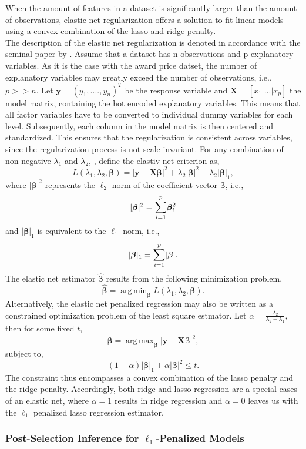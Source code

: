 \documentclass[a4paper,12pt, headsepline]{scrartcl}
\DeclareMathOperator*{\argminA}{arg\,min}
\DeclareMathOperator*{\argmaxA}{arg\,max}
\numberwithin{equation}{section}
\begin{document}
When the amount of features in a dataset is significantly larger than the amount of observations, elastic net regularization offers a solution to fit linear models using a convex combination of the lasso and ridge penalty.\\
The description of the elastic net regularization is denoted in accordance with the seminal paper by \citet{hastie03}. Assume that a dataset has n observations and p explanatory variables. As it is the case with the award price datset, the number of explanatory variables may greatly exceed the number of observations, i.e., $p >> n$. Let $\mathbf{y} = (y_1, ...., y_n)^T$ be the response variable and $\mathbf{X} = [x_1|...|x_p]$ the model matrix, containing the hot encoded explanatory variables. This means that all factor variables have to be converted to individual dummy variables for each level. Subsequently, each column in the model matrix is then centered and standardized. This ensures that the regularization is consistent across variables, since the regularization process is not scale invariant. For any combination of non-negative $\lambda_1$ and $\lambda_2$, \citet{hastie03}, define the elastiv net criterion as,
\[
L(\lambda_1, \lambda_2, \bm{\beta}) = |\mathbf{y} - \mathbf{X}\bm{\beta}|^2 +\lambda_2|\bm{\beta}|^2 +\lambda_2|\bm{\beta}|_1, 
\]
where $|\bm{\beta}|^2$ represents the $\ell_2$ norm of the coefficient vector $\bm{\beta}$, i.e., 
\[
|\bm{\beta}|^2 = \mathlarger{\sum}\limits_{i = 1}^{p}\bm{\beta}_i^2
\]
and $|\bm{\beta}|_1$ is equivalent to the $\ell_1$ norm, i.e.,  
\[
|\bm{\beta}|_1 = \mathlarger{\sum}\limits_{i = 1}^{p}|\bm{\beta}|.
\]
The elastic net estimator $\bm{\hat{\beta}}$ results from the following minimization problem,
\[
\bm{\hat{\beta}} = \argminA_{\bm{\beta}} L(\lambda_1, \lambda_2, \bm{\beta}).
\]
Alternatively, the elastic net penalized regression may also be written as a constrained optimization problem of the least square estmator. Let $\alpha = \frac{\lambda_2}{\lambda_2 + \lambda_1}$, then for some fixed $t$, 
\[
\bm{\hat{\beta}} = \argmaxA_{\bm{\beta}} |\mathbf{y} - \mathbf{X}\bm{\beta}|^2,
\]
subject to,
\[
(1 - \alpha)|\bm{\beta}|_1 + \alpha|\bm{\beta}|^2 \leq t.
\]
The constraint thus encompasses a convex combination of the lasso penalty and the ridge penalty. Accordingly, both ridge and lasso regression are a special cases of an elastic net, where $\alpha = 1$ results in ridge regression and $\alpha = 0$ leaves us with the $\ell_1$ penalized lasso regression estimator.

\subsubsection{Post-Selection Inference for $\ell_1$-Penalized Models}\label{subsubsec:psi}
\end{document}
